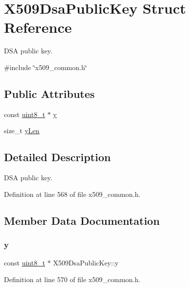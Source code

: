\hypertarget{structX509DsaPublicKey}{}\section{X509\+Dsa\+Public\+Key Struct Reference}
\label{structX509DsaPublicKey}


D\+SA public key.  




{\ttfamily \#include \char`\"{}x509\+\_\+common.\+h\char`\"{}}

\subsection*{Public Attributes}
\begin{DoxyCompactItemize}
\item 
const \hyperlink{stdint_8h_aba7bc1797add20fe3efdf37ced1182c5}{uint8\+\_\+t} $\ast$ \hyperlink{structX509DsaPublicKey_a8a2e4dd10c344dfeae0d55487b2bfce8}{y}
\item 
size\+\_\+t \hyperlink{structX509DsaPublicKey_ae8ad5e10e6090c0b95a083b49efe18b2}{y\+Len}
\end{DoxyCompactItemize}


\subsection{Detailed Description}
D\+SA public key. 

Definition at line 568 of file x509\+\_\+common.\+h.



\subsection{Member Data Documentation}
\mbox{\label{structX509DsaPublicKey_a8a2e4dd10c344dfeae0d55487b2bfce8}} 
\subsubsection{\texorpdfstring{y}{y}}
{\footnotesize\ttfamily const \hyperlink{stdint_8h_aba7bc1797add20fe3efdf37ced1182c5}{uint8\+\_\+t} $\ast$ X509\+Dsa\+Public\+Key\+::y}



Definition at line 570 of file x509\+\_\+common.\+h.

